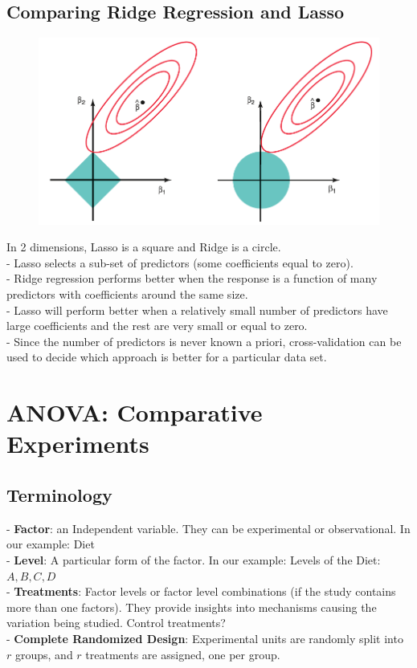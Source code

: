 \documentclass[11pt,a4paper]{article}
\begin{document}
\subsection{Comparing Ridge Regression and Lasso}
\begin{center}\begin{figure}[htbp]
    \centering
    \includegraphics[scale=0.3]{compare.png}
    \caption{}
    \label{}
\end{figure}\end{center}
In 2 dimensions, Lasso is a square and Ridge is a circle.\\
- Lasso selects a sub-set of predictors (some coefficients equal to zero).\\
- Ridge regression performs better when the response is a function of many predictors with coefficients around the same size.\\
- Lasso will perform better when a relatively small number of predictors have large coefficients and the rest are very small or equal to zero.\\
- Since the number of predictors is never known a priori, cross-validation can be used to decide which approach is better for a particular data set.

\section{ANOVA: Comparative Experiments}
\subsection{Terminology}
- \textbf{Factor}: an Independent variable. They can be experimental or observational. In our example: Diet\\
- \textbf{Level}: A particular form of the factor. In our example: Levels of the Diet: $A, B, C, D$\\
- \textbf{Treatments}: Factor levels or factor level combinations (if the study contains more than one factors). They provide insights into mechanisms causing the variation being studied. Control treatments?\\
- \textbf{Complete Randomized Design}: Experimental units are randomly split into $r$ groups, and $r$ treatments are assigned, one per group.
\end{document}

